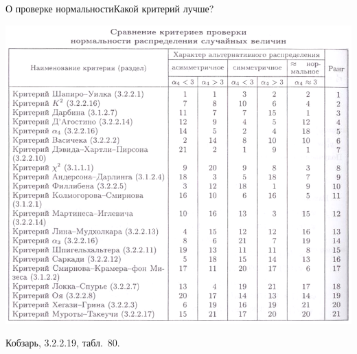 \documentclass[11pt,pdf,utf8,hyperref={unicode},aspectratio=169]{beamer}
\begin{document}
\begin{frame}{О проверке нормальности}{Какой критерий лучше?}
    \begin{center}
        \includegraphics[height=0.8\textheight]{kobzar.png}
    \end{center}
    Кобзарь, 3.2.2.19, табл.~80.
\end{frame}
\end{document}
